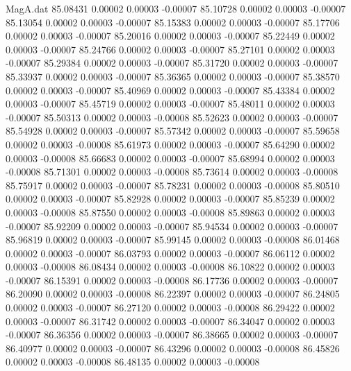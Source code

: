\begin{filecontents}{MagA.dat}
  85.08431    0.00002    0.00003   -0.00007
  85.10728    0.00002    0.00003   -0.00007
  85.13054    0.00002    0.00003   -0.00007
  85.15383    0.00002    0.00003   -0.00007
  85.17706    0.00002    0.00003   -0.00007
  85.20016    0.00002    0.00003   -0.00007
  85.22449    0.00002    0.00003   -0.00007
  85.24766    0.00002    0.00003   -0.00007
  85.27101    0.00002    0.00003   -0.00007
  85.29384    0.00002    0.00003   -0.00007
  85.31720    0.00002    0.00003   -0.00007
  85.33937    0.00002    0.00003   -0.00007
  85.36365    0.00002    0.00003   -0.00007
  85.38570    0.00002    0.00003   -0.00007
  85.40969    0.00002    0.00003   -0.00007
  85.43384    0.00002    0.00003   -0.00007
  85.45719    0.00002    0.00003   -0.00007
  85.48011    0.00002    0.00003   -0.00007
  85.50313    0.00002    0.00003   -0.00008
  85.52623    0.00002    0.00003   -0.00007
  85.54928    0.00002    0.00003   -0.00007
  85.57342    0.00002    0.00003   -0.00007
  85.59658    0.00002    0.00003   -0.00008
  85.61973    0.00002    0.00003   -0.00007
  85.64290    0.00002    0.00003   -0.00008
  85.66683    0.00002    0.00003   -0.00007
  85.68994    0.00002    0.00003   -0.00008
  85.71301    0.00002    0.00003   -0.00008
  85.73614    0.00002    0.00003   -0.00008
  85.75917    0.00002    0.00003   -0.00007
  85.78231    0.00002    0.00003   -0.00008
  85.80510    0.00002    0.00003   -0.00007
  85.82928    0.00002    0.00003   -0.00007
  85.85239    0.00002    0.00003   -0.00008
  85.87550    0.00002    0.00003   -0.00008
  85.89863    0.00002    0.00003   -0.00007
  85.92209    0.00002    0.00003   -0.00007
  85.94534    0.00002    0.00003   -0.00007
  85.96819    0.00002    0.00003   -0.00007
  85.99145    0.00002    0.00003   -0.00008
  86.01468    0.00002    0.00003   -0.00007
  86.03793    0.00002    0.00003   -0.00007
  86.06112    0.00002    0.00003   -0.00008
  86.08434    0.00002    0.00003   -0.00008
  86.10822    0.00002    0.00003   -0.00007
  86.15391    0.00002    0.00003   -0.00008
  86.17736    0.00002    0.00003   -0.00007
  86.20090    0.00002    0.00003   -0.00008
  86.22397    0.00002    0.00003   -0.00007
  86.24805    0.00002    0.00003   -0.00007
  86.27120    0.00002    0.00003   -0.00008
  86.29422    0.00002    0.00003   -0.00007
  86.31742    0.00002    0.00003   -0.00007
  86.34047    0.00002    0.00003   -0.00007
  86.36356    0.00002    0.00003   -0.00007
  86.38665    0.00002    0.00003   -0.00007
  86.40977    0.00002    0.00003   -0.00007
  86.43296    0.00002    0.00003   -0.00008
  86.45826    0.00002    0.00003   -0.00008
  86.48135    0.00002    0.00003   -0.00008

\end{filecontents}
